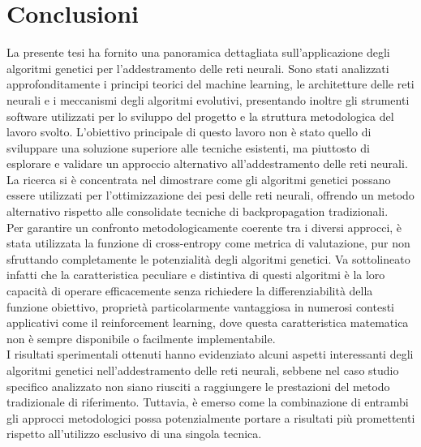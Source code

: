 \chapter{Conclusioni}
    La presente tesi ha fornito una panoramica dettagliata sull'applicazione degli algoritmi genetici per l'addestramento delle reti neurali. Sono stati analizzati approfonditamente i principi teorici del machine learning, le architetture delle reti neurali e i meccanismi degli algoritmi evolutivi, presentando inoltre gli strumenti software utilizzati per lo sviluppo del progetto e la struttura metodologica del lavoro svolto.
    L'obiettivo principale di questo lavoro non è stato quello di sviluppare una soluzione  superiore alle tecniche esistenti, ma piuttosto di esplorare e validare un approccio alternativo all'addestramento delle reti neurali. La ricerca si è concentrata nel dimostrare come gli algoritmi genetici possano essere  utilizzati per l'ottimizzazione dei pesi delle reti neurali, offrendo un metodo alternativo rispetto alle consolidate tecniche di backpropagation tradizionali.\\
    Per garantire un confronto metodologicamente coerente tra i diversi approcci, è stata  utilizzata la funzione di cross-entropy come metrica di valutazione, pur non sfruttando completamente le potenzialità degli algoritmi genetici. Va sottolineato infatti che la caratteristica peculiare e distintiva di questi algoritmi è la loro capacità di operare efficacemente senza richiedere la differenziabilità della funzione obiettivo, proprietà particolarmente vantaggiosa in numerosi contesti applicativi come il reinforcement learning, dove questa caratteristica matematica non è sempre disponibile o facilmente implementabile.\\
    I risultati sperimentali ottenuti hanno evidenziato alcuni aspetti interessanti degli algoritmi genetici nell'addestramento delle reti neurali, sebbene nel caso studio specifico analizzato non siano riusciti a raggiungere le prestazioni del metodo tradizionale di riferimento. Tuttavia, è emerso come la combinazione di entrambi gli approcci metodologici possa potenzialmente portare a risultati più promettenti rispetto all'utilizzo esclusivo di una singola tecnica.

